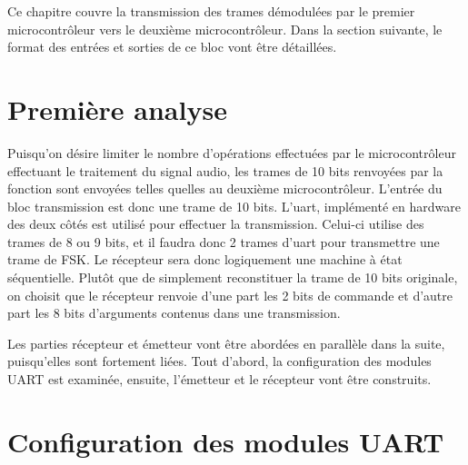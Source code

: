Ce chapitre couvre la transmission des trames démodulées par le premier microcontrôleur vers le deuxième microcontrôleur. Dans la section suivante, le format des entrées et sorties de ce bloc vont être détaillées.

\section{Première analyse}
Puisqu'on désire limiter le nombre d'opérations effectuées par le microcontrôleur effectuant le traitement du signal audio, les trames de 10 bits renvoyées par la fonction  sont envoyées telles quelles au deuxième microcontrôleur. L'entrée du bloc transmission est donc une trame de 10 bits. L'uart, implémenté en hardware des deux côtés est utilisé pour effectuer la transmission. Celui-ci utilise des trames de 8 ou 9 bits, et il faudra donc 2 trames d'uart pour transmettre une trame de FSK. Le récepteur sera donc logiquement une machine à état séquentielle. Plutôt que de simplement reconstituer la trame de 10 bits originale, on choisit que le récepteur renvoie d'une part les 2 bits de commande et d'autre part les 8 bits d'arguments contenus dans une transmission.

Les parties récepteur et émetteur vont être abordées en parallèle dans la suite, puisqu'elles sont fortement liées. Tout d'abord, la configuration des modules UART est examinée, ensuite, l'émetteur et le récepteur vont être construits.

\section{Configuration des modules UART}